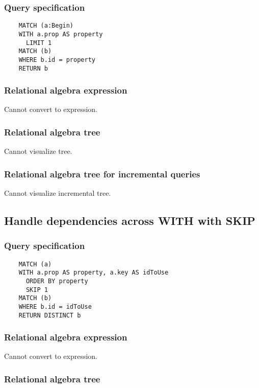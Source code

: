	\subsubsection*{Query specification}

	\begin{lstlisting}
	MATCH (a:Begin)
	WITH a.prop AS property
	  LIMIT 1
	MATCH (b)
	WHERE b.id = property
	RETURN b
	\end{lstlisting}


	\subsubsection*{Relational algebra expression}

	Cannot convert to expression.

	\subsubsection*{Relational algebra tree}

	Cannot visualize tree.

	\subsubsection*{Relational algebra tree for incremental queries}

	Cannot visualize incremental tree.
	\subsection{Handle dependencies across WITH with SKIP}

	\subsubsection*{Query specification}

	\begin{lstlisting}
	MATCH (a)
	WITH a.prop AS property, a.key AS idToUse
	  ORDER BY property
	  SKIP 1
	MATCH (b)
	WHERE b.id = idToUse
	RETURN DISTINCT b
	\end{lstlisting}


	\subsubsection*{Relational algebra expression}

	Cannot convert to expression.

	\subsubsection*{Relational algebra tree}


